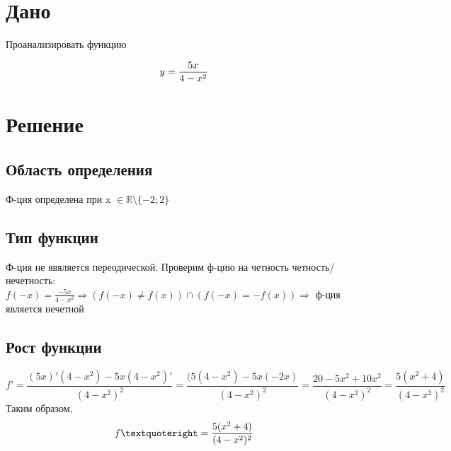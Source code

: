 

\section{Дано}
   Проанализировать функцию 

\begin{equation}
    \centering
    \label{eq:eq1}
    y=\frac{5x}{4-x^2}
\end{equation}


\section{Решение}

\subsection{Область определения} 
    Ф-ция определена при x $\in \mathbb{R} \setminus\{-2; 2\}$
\subsection{Тип функции}\label{sec:2.2}
    Ф-ция не явяляется переодической.
    Проверим ф-цию на четность четность/нечетность:
   $ f(-x)=\frac{-5x}{4-x^2}  \Rightarrow (f(-x) \neq f(x)) \cap (f(-x) = -f(x)) \Rightarrow $ ф-ция является нечетной
\subsection{Рост функции}
    \[f’ = \frac{(5x)'(4-x^2)-5x(4-x^2)'}{(4-x^2)^2}
          = \frac{(5(4-x^2)-5x(-2x)}{(4-x^2)^2} 
          = \frac{20-5x^2+10x^2}{(4-x^2)^2} 
          = \frac{5(x^2+4)}{(4-x^2)^2}
     \]
    Таким образом, 
    \begin{equation}
    \centering
    \label{eq:eq2}
        f’ = \frac{5(x^2+4)}{(4-x^2)^2}
    \end{equation}

